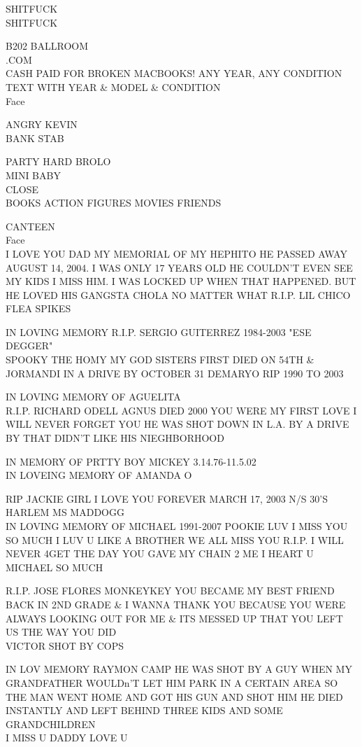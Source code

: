 \documentclass[10pt,letterpaper]{article}
\begin{document}
SHITFUCK\\
SHITFUCK

B202 BALLROOM\\
.COM\\
CASH PAID FOR BROKEN MACBOOKS!  ANY YEAR, ANY CONDITION TEXT WITH YEAR \& MODEL \& CONDITION\\
Face

ANGRY KEVIN\\
BANK STAB

PARTY HARD BROLO\\
MINI BABY\\
CLOSE\\
BOOKS ACTION FIGURES MOVIES FRIENDS

CANTEEN\\
Face\\
I LOVE YOU DAD MY MEMORIAL OF MY HEPHITO HE PASSED AWAY AUGUST 14, 2004.  I WAS ONLY 17 YEARS OLD HE COULDN'T EVEN SEE MY KIDS I MISS HIM.  I WAS LOCKED UP WHEN THAT HAPPENED.  BUT HE LOVED HIS GANGSTA CHOLA NO MATTER WHAT R.I.P. LIL CHICO FLEA SPIKES

IN LOVING MEMORY R.I.P. SERGIO GUITERREZ 1984{-}2003 "ESE DEGGER"\\
SPOOKY THE HOMY MY GOD SISTERS FIRST DIED ON 54TH \& JORMANDI IN A DRIVE BY OCTOBER 31 DEMARYO RIP 1990 TO 2003

IN LOVING MEMORY OF AGUELITA\\
R.I.P. RICHARD ODELL AGNUS DIED 2000 YOU WERE MY FIRST LOVE I WILL NEVER FORGET YOU HE WAS SHOT DOWN IN L.A. BY A DRIVE BY THAT DIDN'T LIKE HIS NIEGHBORHOOD

IN MEMORY OF PRTTY BOY MICKEY 3.14.76{-}11.5.02\\
IN LOVEING MEMORY OF AMANDA O

RIP JACKIE GIRL I LOVE YOU FOREVER MARCH 17, 2003 N/S 30'S HARLEM MS MADDOGG\\
IN LOVING MEMORY OF MICHAEL 1991{-}2007 POOKIE LUV I MISS YOU SO MUCH I LUV U LIKE A BROTHER WE ALL MISS YOU R.I.P. I WILL NEVER 4GET THE DAY YOU GAVE MY CHAIN 2 ME I HEART U MICHAEL SO MUCH

R.I.P. JOSE FLORES MONKEYKEY YOU BECAME MY BEST FRIEND BACK IN 2ND GRADE \& I WANNA THANK YOU BECAUSE YOU WERE ALWAYS LOOKING OUT FOR ME \& ITS MESSED UP THAT YOU LEFT US THE WAY YOU DID\\
VICTOR SHOT BY COPS

IN LOV MEMORY RAYMON CAMP HE WAS SHOT BY A GUY WHEN MY GRANDFATHER WOULDn'T LET HIM PARK IN A CERTAIN AREA SO THE MAN WENT HOME AND GOT HIS GUN AND SHOT HIM HE DIED INSTANTLY AND LEFT BEHIND THREE KIDS AND SOME GRANDCHILDREN\\
I MISS U DADDY LOVE U
\end{document}
